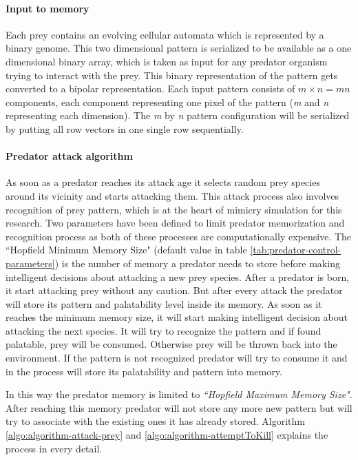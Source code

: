 \documentclass[letterpaper]{article}
\numberwithin{equation}{section}
\begin{document}
\paragraph{Input to memory}
Each prey contains an evolving cellular automata which is represented by a binary genome. This two dimensional pattern is serialized to be available as a one dimensional binary array, which is taken as input for any predator organism trying to interact with the prey. This binary representation of the pattern gets converted to a bipolar representation. Each input pattern consists of \(\textit{m} \times \textit{n} = \textit{mn}\) components, each component representing one pixel of the pattern (\textit{m} and \textit{n} representing each dimension). The \textit{m} by \textit{n} pattern configuration will be serialized by putting all row vectors in one single row sequentially.

\paragraph{Predator attack algorithm}
As soon as a predator reaches its attack age it selects random prey species around its vicinity and starts attacking them. This attack process also involves recognition of prey pattern, which is at the heart of mimicry simulation for this research. Two parameters have been defined to limit predator memorization and recognition process as both of these processes are computationally expensive. The ``Hopfield Minimum Memory Size" (default value in table \ref{tab:predator-control-parameters}) is the number of memory a predator needs to store before making intelligent decisions about attacking a new prey species. After a predator is born, it start attacking prey without any caution. But after every attack the predator will store its pattern and palatability level inside its memory. As soon as it reaches the minimum memory size, it will start making intelligent decision about attacking the next species. It will try to recognize the pattern and if found palatable, prey will be consumed. Otherwise prey will be thrown back into the environment. If the pattern is not recognized predator will try to consume it and in the process will store its palatability and pattern into memory. 

In this way the predator memory is limited to \textsl{``Hopfield Maximum Memory Size"}. After reaching this memory predator will not store any more new pattern but will try to associate with the existing ones it has already stored. Algorithm \ref{algo:algorithm-attack-prey} and \ref{algo:algorithm-attemptToKill} explains the process in every detail.
\end{document}
